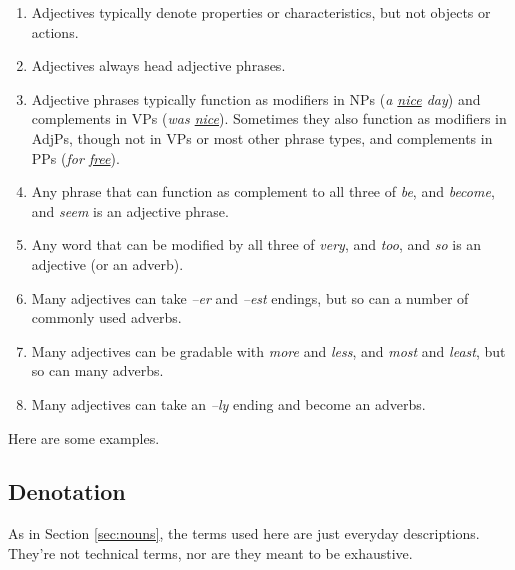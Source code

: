 \begin{enumerate}[noitemsep]
    \item {}Adjectives typically denote properties or characteristics, but not objects or actions.
    \item {}Adjectives always head adjective phrases.
    \item {}Adjective phrases typically function as modifiers in NPs (\textit{a \uline{nice} day}) and complements in VPs (\textit{was \uline{nice}}). Sometimes they also function as modifiers in AdjPs, though not in VPs or most other phrase types, and complements in PPs (\textit{for \uline{free}}).
    \item {}Any phrase that can function as complement to all three of \textit{be}, and \textit{become}, and \textit{seem} is an adjective phrase.
    \item {}Any word that can be modified by all three of \textit{very}, and \textit{too}, and \textit{so} is an adjective (or an adverb).
    \item {}Many adjectives can take \textit{--er} and \textit{--est} endings, but so can a number of commonly used adverbs.
    \item Many adjectives can be gradable with \textit{more} and \textit{less}, and \textit{most} and \textit{least}, but so can many adverbs.
    \item {}Many adjectives can take an \textit{--ly} ending and become an adverbs.
\end{enumerate}

Here are some examples.

\subsection*{Denotation}

As in Section \ref{sec:nouns}, the terms used here are just everyday descriptions. They're not technical terms, nor are they meant to be exhaustive.

